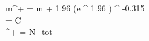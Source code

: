 \ln m^+ = \ln m + 1.96 \sigma \cdot (e ^ {1.96 \sigma}) ^ {-0.315}\\
\sigma =  {\sqrt C}\\
\mu^+ =  {N_{tot}}